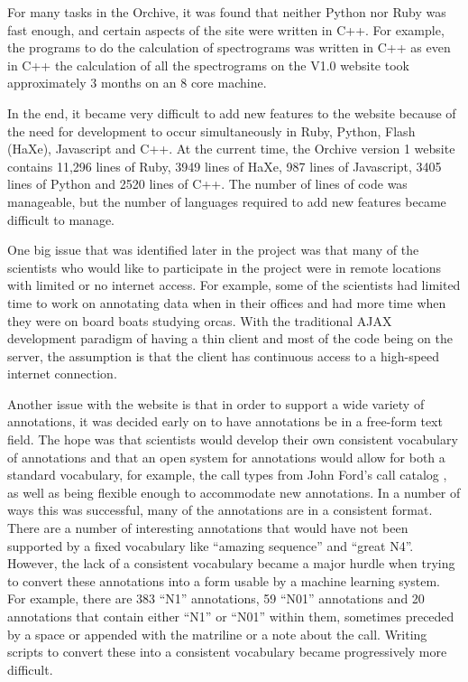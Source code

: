 For many tasks in the Orchive, it was found that neither Python nor
Ruby was fast enough, and certain aspects of the site were written in
C++.  For example, the programs to do the calculation of spectrograms
was written in C++ as even in C++ the calculation of all the
spectrograms on the V1.0 website took approximately 3 months on an 8
core machine.

In the end, it became very difficult to add new features to the
website because of the need for development to occur simultaneously in
Ruby, Python, Flash (HaXe), Javascript and C++.  At the current time,
the Orchive version 1 website contains 11,296 lines of Ruby, 3949
lines of HaXe, 987 lines of Javascript, 3405 lines of Python and 2520
lines of C++.  The number of lines of code was manageable, but the
number of languages required to add new features became difficult to
manage.

One big issue that was identified later in the project was that many
of the scientists who would like to participate in the project were in
remote locations with limited or no internet access.  For example,
some of the scientists had limited time to work on annotating data
when in their offices and had more time when they were on board boats
studying orcas.  With the traditional AJAX development paradigm of
having a thin client and most of the code being on the server, the
assumption is that the client has continuous access to a high-speed
internet connection.

Another issue with the website is that in order to support a wide
variety of annotations, it was decided early on to have annotations be
in a free-form text field.  The hope was that scientists would develop
their own consistent vocabulary of annotations and that an open system
for annotations would allow for both a standard vocabulary, for
example, the call types from John Ford's call catalog
\cite{ford1987catalogue}, as well as being flexible enough to
accommodate new annotations.  In a number of ways this was successful,
many of the annotations are in a consistent format.  There are a
number of interesting annotations that would have not been supported
by a fixed vocabulary like ``amazing sequence'' and ``great N4''.
However, the lack of a consistent vocabulary became a major hurdle
when trying to convert these annotations into a form usable by a
machine learning system.  For example, there are 383 ``N1''
annotations, 59 ``N01'' annotations and 20 annotations that contain
either ``N1'' or ``N01'' within them, sometimes preceded by a space or
appended with the matriline or a note about the call.  Writing scripts
to convert these into a consistent vocabulary became progressively
more difficult.

